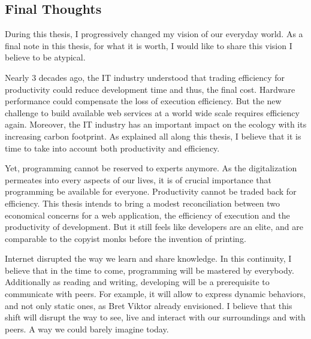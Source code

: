 

\subsection{Final Thoughts}

During this thesis, I progressively changed my vision of our everyday world.
As a final note in this thesis, for what it is worth, I would like to share this vision I believe to be atypical.


Nearly 3 decades ago, the IT industry understood that trading efficiency for productivity could reduce development time and thus, the final cost.
Hardware performance could compensate the loss of execution efficiency.
But the new challenge to build available web services at a world wide scale requires efficiency again.
Moreover, the IT industry has an important impact on the ecology with its increasing carbon footprint.
As explained all along this thesis, I believe that it is time to take into account both productivity and efficiency.

Yet, programming cannot be reserved to experts anymore.
As the digitalization permeates into every aspects of our lives, it is of crucial importance that programming be available for everyone.
Productivity cannot be traded back for efficiency.
This thesis intends to bring a modest reconciliation between two economical concerns for a web application, the efficiency of execution and the productivity of development.
But it still feels like developers are an elite, and are comparable to the copyist monks before the invention of printing.

Internet disrupted the way we learn and share knowledge.
In this continuity, I believe that in the time to come, programming will be mastered by everybody.
Additionally as reading and writing, developing will be a prerequisite to communicate with peers.
For example, it will allow to express dynamic behaviors, and not only static ones, as Bret Viktor already envisioned.
I believe that this shift will disrupt the way to see, live and interact with our surroundings and with peers.
A way we could barely imagine today.

